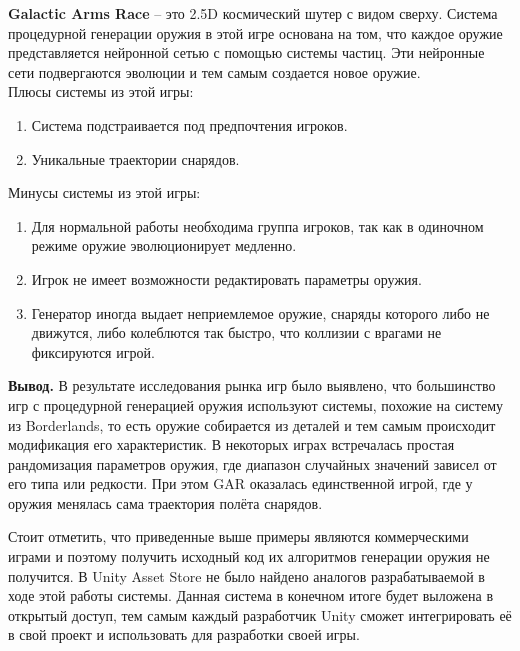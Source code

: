 \textbf{Galactic Arms Race} -- это 2.5D космический шутер с видом сверху. Система процедурной генерации оружия в этой игре основана на том, что каждое оружие представляется нейронной сетью с помощью системы частиц. Эти нейронные сети подвергаются эволюции и тем самым создается новое оружие.
%
\\Плюсы системы из этой игры:
\begin{enumerate}[--]
    \item Система подстраивается под предпочтения игроков.
    \item Уникальные траектории снарядов.
\end{enumerate}
%
Минусы системы из этой игры:
\begin{enumerate}[--]
    \item Для нормальной работы необходима группа игроков, так как в одиночном режиме оружие эволюционирует медленно.
    \item Игрок не имеет возможности редактировать параметры оружия.
    \item Генератор иногда выдает неприемлемое оружие, снаряды которого либо не движутся, либо колеблются так быстро, что коллизии с врагами не фиксируются игрой.
\end{enumerate}

\vspace{1mm}

\textbf{Вывод.} В результате исследования рынка игр было выявлено, что большинство игр с процедурной генерацией оружия используют системы, похожие на систему из Borderlands, то есть оружие собирается из деталей и тем самым происходит модификация его характеристик. В некоторых играх встречалась простая рандомизация параметров оружия, где диапазон случайных значений зависел от его типа или редкости. При этом GAR оказалась единственной игрой, где у оружия менялась сама траектория полёта снарядов.

Стоит отметить, что приведенные выше примеры являются коммерческими играми и поэтому получить исходный код их алгоритмов генерации оружия не получится. В Unity Asset Store не было найдено аналогов разрабатываемой в ходе этой работы системы. Данная система в конечном итоге будет выложена в открытый доступ, тем самым каждый разработчик Unity сможет интегрировать её в свой проект и использовать для разработки своей игры.




